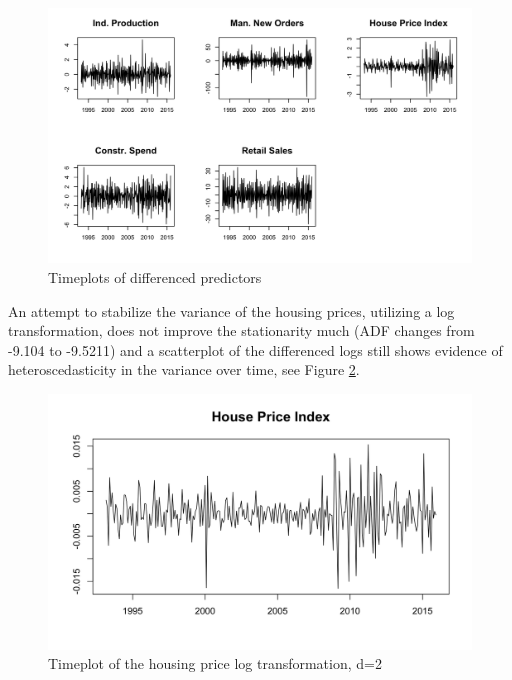 \documentclass[twoside,twocolumn]{article}
\begin{document}
		\begin{figure}[htb]
		\centering
		\caption{Timeplots of differenced predictors}
		\label{fig:statpred}
		\includegraphics[width=\linewidth]{images/StationaryPred}
		\end{figure}

An attempt to stabilize the variance of the housing prices, utilizing a log transformation, does not improve the stationarity much (ADF changes from -9.104 to -9.5211) and a scatterplot of the differenced logs still shows evidence of heteroscedasticity in the variance over time, see Figure \ref{fig:loghouse}.



		\begin{figure}[htb]
		\centering
		\caption{Timeplot of the housing price log transformation, d=2}
		\label{fig:loghouse}
		\includegraphics[width=\linewidth]{images/houseprice}
	\end{figure}
\end{document}
